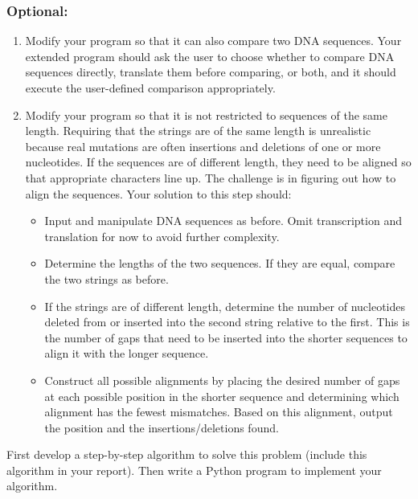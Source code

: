 \subsubsection*{Optional:}
\begin{enumerate}
	\item Modify your program so that it can also compare two DNA sequences. Your extended program should ask the user to choose whether to compare DNA sequences directly, translate them before comparing, or both, and it should execute the user-defined comparison appropriately.
	\item Modify your program so that it is not restricted to sequences of the same length. Requiring that the strings are of the same length is unrealistic because real mutations are often insertions and deletions of one or more nucleotides. If the sequences are of different length, they need to be aligned so that appropriate characters line up. The challenge is in figuring out how to align the sequences. Your solution to this step should:
	\begin{itemize}
		\item Input and manipulate DNA sequences as before. Omit transcription and translation for now to avoid further complexity. 
		\item Determine the lengths of the two sequences. If they are equal, compare the two strings as before.
		\item If the strings are of different length, determine the number of nucleotides deleted from or inserted into the second string relative to the first. This is the number of gaps that need to be inserted into the shorter sequences to align it with the longer sequence.
		\item Construct all possible alignments by placing the desired number of gaps at each possible position in the shorter sequence and determining which alignment has the fewest mismatches. Based on this alignment, output the position and the insertions/deletions found. 
	\end{itemize}
\end{enumerate}
	
First develop a step-by-step algorithm to solve this problem (include this algorithm in your report). Then write a Python program to implement your algorithm. 


\vspace*{-.1in}
